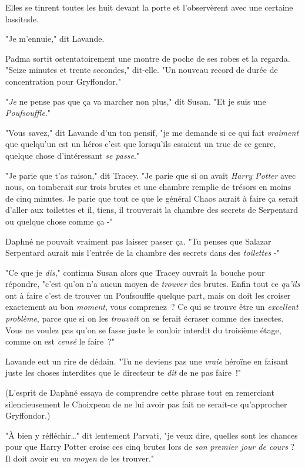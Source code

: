 Elles se tinrent toutes les huit devant la porte et l'observèrent avec une certaine lassitude.

"Je m'ennuie," dit Lavande.

Padma sortit ostentatoirement une montre de poche de ses robes et la regarda. "Seize minutes et trente secondes," dit-elle. "Un nouveau record de durée de concentration pour Gryffondor."

"\emph{Je} ne pense pas que ça va marcher non plus," dit Susan. "Et je suis une \emph{Poufsouffle}."

"Vous savez," dit Lavande d'un ton pensif, "je me demande si ce qui fait \emph{vraiment} que quelqu'un est un héros c'est que lorsqu'ils essaient un truc de ce genre, quelque chose d'intéressant \emph{se passe}."

"Je parie que t'as raison," dit Tracey. "Je parie que si on avait \emph{Harry Potter} avec nous, on tomberait sur trois brutes et une chambre remplie de trésors en moins de cinq minutes. Je parie que tout ce que le général Chaos aurait à faire ça serait d'aller aux toilettes et il, tiens, il trouverait la chambre des secrets de Serpentard ou quelque chose comme ça -"

Daphné ne pouvait vraiment pas laisser passer ça. "Tu penses que Salazar Serpentard aurait mis l'entrée de la chambre des secrets dans des \emph{toilettes} -"

"Ce que je \emph{dis}," continua Susan alors que Tracey ouvrait la bouche pour répondre, "c'est qu'on n'a aucun moyen de \emph{trouver} des brutes. Enfin tout ce \emph{qu'ils} ont à faire c'est de trouver un Poufsouffle quelque part, mais on doit les croiser exactement au bon \emph{moment}, vous comprenez~? Ce qui se trouve être un \emph{excellent problème}, parce que si on les \emph{trouvait} on se ferait écraser comme des insectes. Vous ne voulez pas qu'on se fasse juste le couloir interdit du troisième étage, comme on est \emph{censé} le faire~?"

Lavande eut un rire de dédain. "Tu ne deviens pas une \emph{vraie} héroïne en faisant juste les choses interdites que le directeur te \emph{dit} de ne pas faire~!"

(L'esprit de Daphné essaya de comprendre cette phrase tout en remerciant silencieusement le Choixpeau de ne lui avoir pas fait ne serait-ce qu'approcher Gryffondor.)

"À bien y réfléchir…" dit lentement Parvati, "je veux dire, quelles sont les chances pour que Harry Potter croise ces cinq brutes lors de \emph{son premier jour de cours} ? Il doit avoir eu \emph{un moyen} de les trouver."

